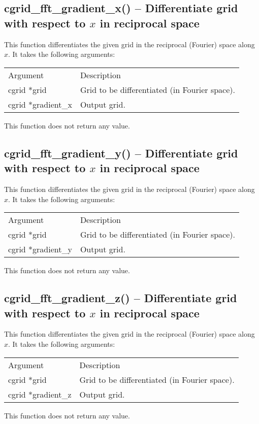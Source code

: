 \documentclass[12pt,letterpaper]{report}
\begin{document}
\subsection{cgrid\_fft\_gradient\_x() -- Differentiate grid with respect to $x$ in reciprocal space}

This function differentiates the given grid in the reciprocal (Fourier) space along $x$. It takes the following arguments:                                                                                     
\begin{longtable}{p{} p{}}
Argument & Description\\
\cline{1-2}
cgrid *grid & Grid to be differentiated (in Fourier space).\\                                                          
cgrid *gradient\_x & Output grid.\\
\end{longtable}
\noindent
This function does not return any value.

\subsection{cgrid\_fft\_gradient\_y() -- Differentiate grid with respect to $x$ in reciprocal space}

This function differentiates the given grid in the reciprocal (Fourier) space along $x$. It takes the following arguments:                                                                                     
\begin{longtable}{p{} p{}}
Argument & Description\\
\cline{1-2}
cgrid *grid & Grid to be differentiated (in Fourier space).\\                                                          
cgrid *gradient\_y & Output grid.\\
\end{longtable}
\noindent
This function does not return any value.

\subsection{cgrid\_fft\_gradient\_z() -- Differentiate grid with respect to $x$ in reciprocal space}

This function differentiates the given grid in the reciprocal (Fourier) space along $x$. It takes the following arguments:                                                                                     
\begin{longtable}{p{} p{}}
Argument & Description\\
\cline{1-2}
cgrid *grid & Grid to be differentiated (in Fourier space).\\                                                          
cgrid *gradient\_z & Output grid.\\
\end{longtable}
\noindent
This function does not return any value.
\end{document}
